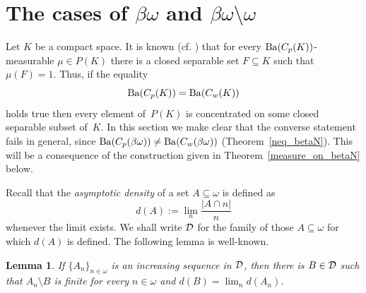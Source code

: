 \documentclass[12pt]{amsart}
\newcommand{\DD}{\protect{\mathcal D}}
\newcommand{\sm}{\setminus}
\newcommand{\sub}{\subseteq}
\newcommand{\Ba}{{\rm Ba}}
\newcommand{\0}{\protect{\bf 0}}
\newcommand{\1}{\protect{\bf 1}}
\newtheorem{lemma}[theo]{Lemma}
\theoremstyle{definition}
\theoremstyle{remark}
\numberwithin{equation}{section}
\begin{document}
\section{The cases of $\beta\omega$ and $\beta\omega \sm \omega$}\label{section:betaN}

Let $K$ be a compact space. It is known (cf. \cite[Proposition~3.6]{rod-ver}) that
for every $\Ba(C_p(K))$-measurable $\mu \in P(K)$ there is a 
closed separable set $F\sub K$ such that $\mu(F)=1$. Thus, 
if the equality 
$$
	\Ba(C_p(K))=\Ba(C_w(K))
$$ 
holds true then every element of~$P(K)$
is concentrated on some closed separable subset of~$K$. In this section we make clear
that the converse statement fails in general, since
$\Ba(C_p(\beta\omega))\neq \Ba(C_w(\beta\omega))$ (Theorem~\ref{neq_betaN}).
This will be a consequence of the construction given in Theorem~\ref{measure_on_betaN} below.

Recall that the {\em asymptotic density} of a set $A\sub\omega$ is defined as
$$
	d(A):=\lim_{n}\frac{|A\cap n|}{n}
$$
whenever the limit exists. We shall write $\DD$ for the family of those
$A\sub\omega$ for which $d(A)$ is defined.
The following lemma is well-known.

\begin{lemma}\label{approximation_property}
If $\{A_n\}_{n\in \omega}$ is an increasing sequence in $\DD$, then there is $B\in\DD$ such that
$A_n\sm B$ is finite for every $n\in \omega$ and $d(B)=\lim_n d(A_n)$.
\end{lemma}
\end{document}
